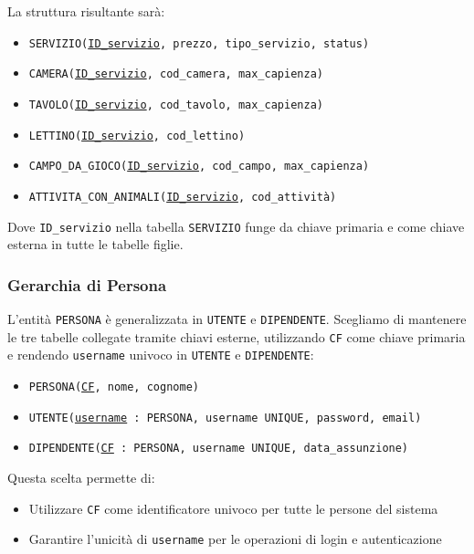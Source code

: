 \documentclass[a4paper,12pt]{report}
\begin{document}
\vspace{\baselineskip}
\noindent La struttura risultante sarà:
\begin{itemize}
	\item \texttt{SERVIZIO(\underline{ID\_servizio}, prezzo, tipo\_servizio, status)}
	\item \texttt{CAMERA(\underline{ID\_servizio}, cod\_camera, max\_capienza)}
	\item \texttt{TAVOLO(\underline{ID\_servizio}, cod\_tavolo, max\_capienza)}
	\item \texttt{LETTINO(\underline{ID\_servizio}, cod\_lettino)}
	\item \texttt{CAMPO\_DA\_GIOCO(\underline{ID\_servizio}, cod\_campo, max\_capienza)}
	\item \texttt{ATTIVITA\_CON\_ANIMALI(\underline{ID\_servizio}, cod\_attività)}
\end{itemize}

Dove \texttt{ID\_servizio} nella tabella \texttt{SERVIZIO} funge da chiave primaria e come chiave esterna in tutte le
tabelle figlie.

\subsubsection*{Gerarchia di Persona}
L'entità \texttt{PERSONA} è generalizzata in \texttt{UTENTE} e \texttt{DIPENDENTE}. Scegliamo di mantenere le tre tabelle
collegate tramite chiavi esterne, utilizzando \texttt{CF} come chiave primaria e rendendo \texttt{username} univoco in \texttt{UTENTE} e \texttt{DIPENDENTE}:

\begin{itemize}
	\item \texttt{PERSONA(\underline{CF}, nome, cognome)}
	\item \texttt{UTENTE(\underline{username} : PERSONA, username~UNIQUE, password, email)}
	\item \texttt{DIPENDENTE(\underline{CF} : PERSONA, username~UNIQUE, data\_assunzione)}
\end{itemize}

\vspace{\baselineskip}
\noindent Questa scelta permette di:
\begin{itemize}
	\item Utilizzare \texttt{CF} come identificatore univoco per tutte le persone del sistema
	\item Garantire l'unicità di \texttt{username} per le operazioni di login e autenticazione
\end{itemize}
\end{document}

